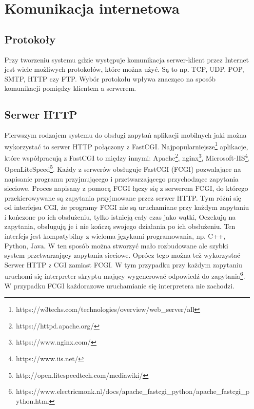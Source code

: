 \documentclass{report}
\begin{document}
		\section{Komunikacja internetowa}
		
			\subsection{Protokoły}
			Przy tworzeniu systemu gdzie występuje komunikacja serwer-klient przez Internet jest wiele możliwych protokołów, które można użyć. Są to np. TCP, UDP, POP, SMTP, HTTP czy FTP. Wybór protokołu wpływa znacząco na sposób komunikacji pomiędzy klientem a serwerem.
	
			\subsection{Serwer HTTP}
			Pierwszym rodzajem systemu do obsługi zapytań aplikacji mobilnych jaki można wykorzystać to serwer HTTP połączony z FastCGI. Najpopularniejsze\footnote{https://w3techs.com/technologies/overview/web\_server/all} aplikacje, które współpracują z FastCGI to między innymi: Apache\footnote{https://httpd.apache.org/}, nginx\footnote{https://www.nginx.com/}, Microsoft-IIS\footnote{https://www.iis.net/}, OpenLiteSpeed\footnote{http://open.litespeedtech.com/mediawiki/}. Każdy z serwerów obsługuje FastCGI (FCGI) pozwalające na napisanie programu przyjmującego i przetwarzającego przychodzące zapytania sieciowe. Proces napisany z pomocą FCGI łączy się z serwerem FCGI, do którego przekierowywane są zapytania przyjmowane przez serwer HTTP. Tym różni się od interfejsu CGI, że programy FCGI nie są uruchamiane przy każdym zapytaniu i kończone po ich obsłużeniu, tylko istnieją cały czas jako wątki, Oczekują na zapytania, obsługują je i nie kończą swojego działania po ich obsłużeniu. Ten interfejs jest kompatybilny z wieloma językami programowania, np. C++, Python, Java. W ten sposób można stworzyć mało rozbudowane ale szybki system przetwarzający zapytania sieciowe.
			Oprócz tego można też wykorzystać Serwer HTTP z CGI zamiast FCGI. W tym przypadku przy każdym zapytaniu uruchomi się interpreter skryptu mający wygenerować odpowiedź do zapytania\footnote{https://www.electricmonk.nl/docs/apache\_fastcgi\_python/apache\_fastcgi\_python.html}. W przypadku FCGI każdorazowe uruchamianie się interpretera nie zachodzi.
			
\end{document}
